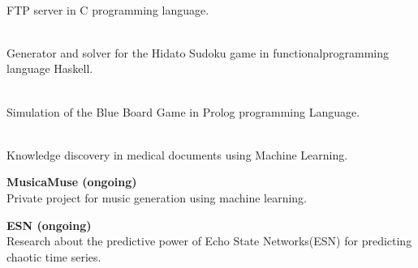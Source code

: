 \documentclass[9pt, blue]{./template/developercv} %
\begin{document}
\begin{minipage}[t]{0.60\textwidth}
	\vspace{1.2mm}
	\textcolor{accentbackground}{\faCode}\hspace{0.5mm}
	\small \textbf{} \\
	\footnotesize FTP server in C programming language.

	\vspace{1.2mm}
	\textcolor{accentbackground}{\faCode}\hspace{0.5mm}
	\small \textbf{} \\
	\footnotesize Generator and solver for the Hidato Sudoku game in functionalprogramming language Haskell.

	\vspace{1.2mm}
	\textcolor{accentbackground}{\faCode}\hspace{0.5mm}
	\small \textbf{} \\
	\footnotesize Simulation of the Blue Board Game in Prolog programming Language.

	\vspace{1.2mm}
	\textcolor{accentbackground}{\faCode}\hspace{0.5mm}
	\small \textbf{} \\
	\footnotesize Knowledge discovery in medical documents using Machine Learning.

	\vspace{1.2mm}
	\textcolor{accentbackground}{\faCode}\hspace{0.5mm}
	\small \textbf{MusicaMuse (ongoing)} \\
	\footnotesize Private project for music generation using machine learning.

	\vspace{1.2mm}
	\textcolor{accentbackground}{\faCode}\hspace{0.5mm}
	\small \textbf{ESN (ongoing)} \\
	\footnotesize Research about the predictive power of Echo State Networks(ESN) for predicting chaotic time series.

\end{minipage}






\end{document}
